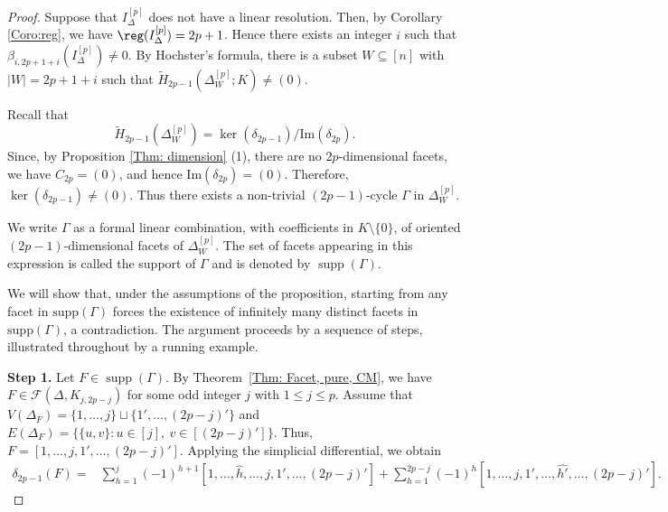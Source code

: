 \documentclass[12pt]{amsart}
\begin{document}
\begin{proof}
  Suppose that $I_{\Delta}^{[p]}$ does not have a linear resolution. Then, by Corollary \ref{Coro:reg}, we have $\reg(I_{\Delta}^{[p]})=2p+1$. Hence there exists an integer $i$ such that $\beta_{i,2p+1+i}(I_{\Delta}^{[p]})\neq 0$. By Hochster's formula, there is a subset $W\subseteq [n]$ with $|W|=2p+1+i$ such that $\widetilde H_{2p-1}(\Delta_W^{[p]};K)\neq (0)$.
  
  Recall that 
\[
\tilde{H}_{2p-1}(\Delta_W^{[p]}) = \ker(\delta_{2p-1}) / \mathrm{Im}(\delta_{2p}).
\]
Since, by Proposition \ref{Thm: dimension} (1), there are no $2p$-dimensional facets, we have $C_{2p} = (0)$, and hence $\mathrm{Im}(\delta_{2p}) = (0)$. Therefore, $\ker(\delta_{2p-1}) \neq (0)$. Thus there exists a non-trivial $(2p-1)$-cycle $\Gamma$ in $\Delta_W^{[p]}$. 

We write $\Gamma$ as a formal linear combination, with coefficients in $K\setminus\{0\}$, of oriented $(2p-1)$-dimensional facets of $\Delta_W^{[p]}$. The set of facets appearing in this expression is called the support of $\Gamma$ and is denoted by $\operatorname{supp}(\Gamma)$. 

We will show that, under the assumptions of the proposition, starting from any facet in $\mathrm{supp}(\Gamma)$ forces the existence of infinitely many distinct facets in $\mathrm{supp}(\Gamma)$, a contradiction. The argument proceeds by a sequence of steps, illustrated throughout by a running example.



\textbf{Step 1.}
Let $F\in \operatorname{supp}(\Gamma)$. By Theorem~\ref{Thm: Facet, pure, CM}, we have $F\in \mathcal{F}(\Delta,K_{j,2p-j})$
for some odd integer $j$ with $1\leq j\leq p$. Assume that $V(\Delta_F)=\{1,\dots,j\}\sqcup\{1',\dots,(2p-j)'\}$
and $E(\Delta_F)=\bigl\{\{u,v\}:u\in [j],\ v\in[(2p-j)']\bigr\}.$
Thus, $F=[1,\dots,j,1',\dots,(2p-j)'].$ Applying the simplicial differential, we obtain
\begin{align*}
\delta_{2p-1}(F)
={}&
\sum_{h=1}^{j}
(-1)^{h+1}
[1,\dots,\widehat{h},\dots,j,1',\dots,(2p-j)']
+
\sum_{h=1}^{2p-j}
(-1)^h
[1,\dots,j,1',\dots,\widehat{h'},\dots,(2p-j)'].
\end{align*}


\end{proof}
\end{document}
